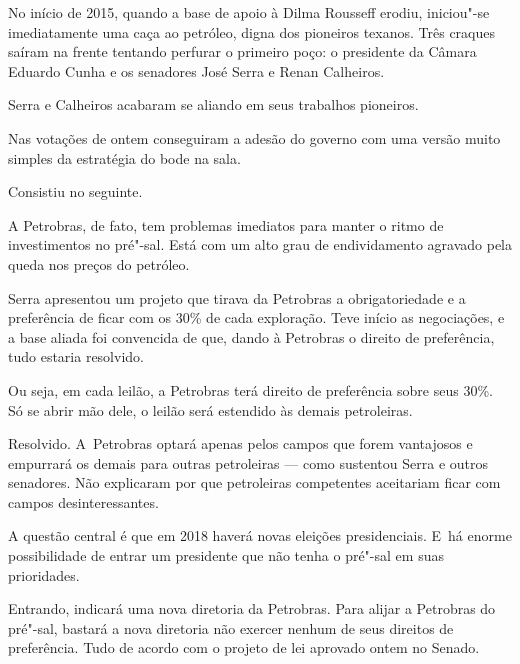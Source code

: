  

No início de 2015, quando a base de apoio à Dilma Rousseff erodiu,
iniciou"-se imediatamente uma caça ao petróleo, digna dos pioneiros
texanos. Três craques saíram na frente tentando perfurar o primeiro
poço: o presidente da Câmara Eduardo Cunha e os senadores José Serra e
Renan Calheiros.

Serra e Calheiros acabaram se aliando em seus trabalhos pioneiros.

Nas votações de ontem conseguiram a adesão do governo com uma versão
muito simples da estratégia do bode na sala.

Consistiu no seguinte.

A Petrobras, de fato, tem problemas imediatos para manter o ritmo de
investimentos no pré"-sal. Está com um alto grau de endividamento
agravado pela queda nos preços do petróleo.

Serra apresentou um projeto que tirava da Petrobras a obrigatoriedade e
a preferência de ficar com os 30\% de cada exploração. Teve início as
negociações, e a base aliada foi convencida de que, dando à Petrobras o
direito de preferência, tudo estaria resolvido.

Ou seja, em cada leilão, a Petrobras terá direito de preferência sobre
seus 30\%. Só se abrir mão dele, o leilão será estendido às demais
petroleiras.

Resolvido. A~Petrobras optará apenas pelos campos que forem vantajosos e
empurrará os demais para outras petroleiras --- como sustentou Serra e
outros senadores. Não explicaram por que petroleiras competentes
aceitariam ficar com campos desinteressantes.

A questão central é que em 2018 haverá novas eleições presidenciais. E~há enorme possibilidade de entrar um presidente que não tenha o pré"-sal
em suas prioridades.

Entrando, indicará uma nova diretoria da Petrobras. Para alijar a
Petrobras do pré"-sal, bastará a nova diretoria não exercer nenhum de
seus direitos de preferência. Tudo de acordo com o projeto de lei
aprovado ontem no Senado.
